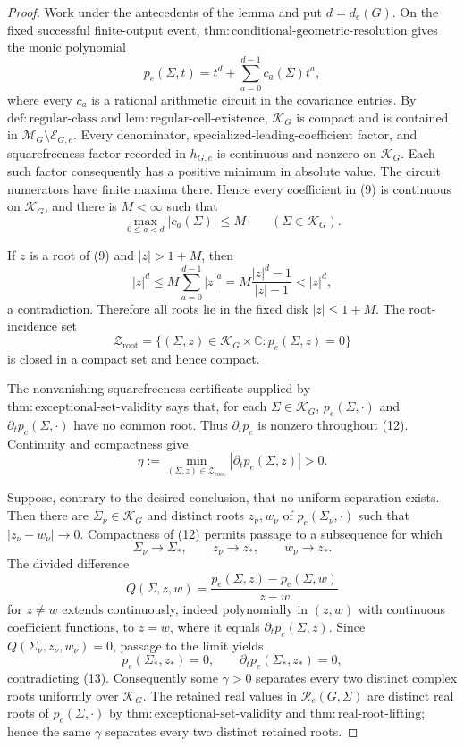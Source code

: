 \documentclass{article}
\begin{document}
\begin{proof}
Work under the antecedents of the lemma and put \(d=d_e(G)\).  On the fixed successful finite-output event, \(\mathrm{thm:conditional\mbox{-}geometric\mbox{-}resolution}\) gives the monic polynomial
\[
 p_e(\Sigma,t)=t^d+\sum_{a=0}^{d-1}c_a(\Sigma)t^a,
\tag{9}
\]
where every \(c_a\) is a rational arithmetic circuit in the covariance entries.  By \(\mathrm{def:regular\mbox{-}class}\) and \(\mathrm{lem:regular\mbox{-}cell\mbox{-}existence}\), \(\mathcal K_G\) is compact and is contained in \(\mathcal M_G\setminus\mathcal E_{G,e}\).  Every denominator, specialized-leading-coefficient factor, and squarefreeness factor recorded in \(h_{G,e}\) is continuous and nonzero on \(\mathcal K_G\).  Each such factor consequently has a positive minimum in absolute value.  The circuit numerators have finite maxima there.  Hence every coefficient in (9) is continuous on \(\mathcal K_G\), and there is \(M<\infty\) such that
\[
 \max_{0\leq a<d}|c_a(\Sigma)|\leq M
 \qquad(\Sigma\in\mathcal K_G).
\tag{10}
\]

If \(z\) is a root of (9) and \(|z|>1+M\), then
\[
 |z|^d
 \leq M\sum_{a=0}^{d-1}|z|^a
 =M\frac{|z|^d-1}{|z|-1}
 <|z|^d,
\tag{11}
\]
a contradiction.  Therefore all roots lie in the fixed disk \(|z|\leq1+M\).  The root-incidence set
\[
 \mathcal Z_{\mathrm{root}}
 =\{(\Sigma,z)\in\mathcal K_G\times\mathbb C:p_e(\Sigma,z)=0\}
\tag{12}
\]
is closed in a compact set and hence compact.

The nonvanishing squarefreeness certificate supplied by \(\mathrm{thm:exceptional\mbox{-}set\mbox{-}validity}\) says that, for each \(\Sigma\in\mathcal K_G\), \(p_e(\Sigma,\cdot)\) and \(\partial_t p_e(\Sigma,\cdot)\) have no common root.  Thus \(\partial_t p_e\) is nonzero throughout (12).  Continuity and compactness give
\[
 \eta
 :=\min_{(\Sigma,z)\in\mathcal Z_{\mathrm{root}}}
 |\partial_t p_e(\Sigma,z)|>0.
\tag{13}
\]

Suppose, contrary to the desired conclusion, that no uniform separation exists.  Then there are \(\Sigma_\nu\in\mathcal K_G\) and distinct roots \(z_\nu,w_\nu\) of \(p_e(\Sigma_\nu,\cdot)\) such that \(|z_\nu-w_\nu|\to0\).  Compactness of (12) permits passage to a subsequence for which
\[
 \Sigma_\nu\to\Sigma_*,\qquad z_\nu\to z_*,\qquad w_\nu\to z_*.
\]
The divided difference
\[
 Q(\Sigma,z,w)
 =\frac{p_e(\Sigma,z)-p_e(\Sigma,w)}{z-w}
\tag{14}
\]
for \(z\ne w\) extends continuously, indeed polynomially in \((z,w)\) with continuous coefficient functions, to \(z=w\), where it equals \(\partial_t p_e(\Sigma,z)\).  Since \(Q(\Sigma_\nu,z_\nu,w_\nu)=0\), passage to the limit yields
\[
 p_e(\Sigma_*,z_*)=0,
 \qquad
 \partial_t p_e(\Sigma_*,z_*)=0,
\]
contradicting (13).  Consequently some \(\gamma>0\) separates every two distinct complex roots uniformly over \(\mathcal K_G\).  The retained real values in \(\mathcal R_e(G,\Sigma)\) are distinct real roots of \(p_e(\Sigma,\cdot)\) by \(\mathrm{thm:exceptional\mbox{-}set\mbox{-}validity}\) and \(\mathrm{thm:real\mbox{-}root\mbox{-}lifting}\); hence the same \(\gamma\) separates every two distinct retained roots.
\end{proof}
\end{document}
